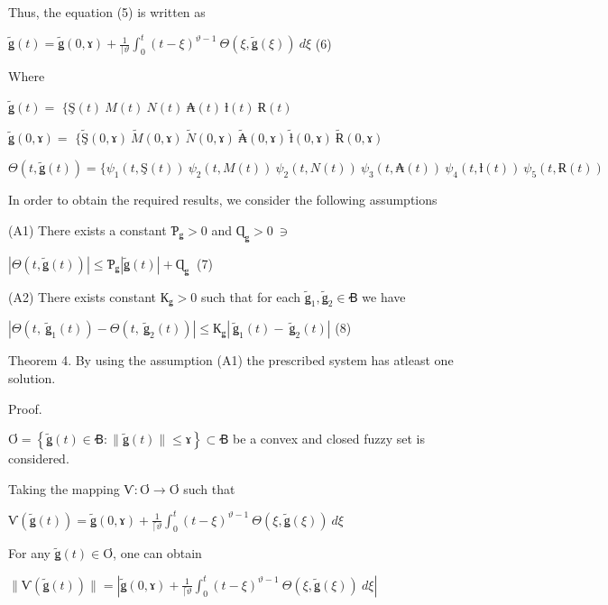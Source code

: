 Thus, the equation (5) is written as

\(\widetilde{ǥ}(t) = \widetilde{ǥ}(0,ɤ) + \frac{1}{\lceil\vartheta}\int_{0}^{t}{}(t - \xi)^{\vartheta - 1}\ \Theta\left( \xi,\widetilde{ǥ}(\xi) \right)\ d\xi\) (6)

Where

\(\widetilde{ǥ}(t) =\) \(\{ Ş(t)\ M(t)\ N(t)\ ₳(t)\ ƚ(t)\ Ɍ(t)\ \)

\(\widetilde{ǥ}(0,ɤ) =\) \(\{\widetilde{Ş}(0,ɤ)\ \widetilde{M}(0,ɤ)\ \widetilde{N}(0,ɤ)\ \widetilde{₳}(0,ɤ)\ \widetilde{ƚ}(0,ɤ)\ \widetilde{Ɍ}(0,ɤ)\ \)

\(\Theta\left( t,\widetilde{ǥ}(t) \right) = \{\psi_{1}\left( t,Ş(t) \right)\ \psi_{2}\left( t,M(t) \right)\ \psi_{2}\left( t,N(t) \right)\ \psi_{3}\left( t,₳(t) \right)\ \psi_{4}\left( t,ƚ(t) \right)\ \psi_{5}\left( t,Ɍ(t) \right)\ \)

In order to obtain the required results, we consider the following assumptions

(A1) There exists a constant \(Ƥ_{ǥ} > 0\) and \(Ɋ_{ǥ} > 0\  \ni \ \)

\(\left| \Theta\left( t,\widetilde{ǥ}(t) \right) \right| \leq Ƥ_{ǥ}\left| \widetilde{ǥ}(t) \right| + Ɋ_{ǥ}\ \) (7)

(A2) There exists constant \(К_{ǥ} > 0\) such that for each \({\widetilde{ǥ}}_{1},{\widetilde{ǥ}}_{2} \in Ꞗ\) we have

\(\left| \Theta\left( t,\ {\widetilde{ǥ}}_{1}(t) \right) - \Theta\left( t,\ {\widetilde{ǥ}}_{2}(t) \right) \right| \leq К_{ǥ}\left| \ {\widetilde{ǥ}}_{1}(t) - \ {\widetilde{ǥ}}_{2}(t) \right|\) (8)

Theorem 4. By using the assumption (A1) the prescribed system has atleast one solution.

Proof.

\(Ơ = \left\{ \widetilde{ǥ}(t) \in Ꞗ:\|\widetilde{ǥ}(t)\| \leq ɤ \right\} \subset Ꞗ\) be a convex and closed fuzzy set is considered.

Taking the mapping \(Ѵ:Ơ \rightarrow Ơ\) such that

\(Ѵ\left( \widetilde{ǥ}(t) \right) = \widetilde{ǥ}(0,ɤ) + \frac{1}{\lceil\vartheta}\int_{0}^{t}{}(t - \xi)^{\vartheta - 1}\ \Theta\left( \xi,\widetilde{ǥ}(\xi) \right)\ d\xi\)

For any \(\widetilde{ǥ}(t) \in Ơ\), one can obtain

\(\| Ѵ\left( \widetilde{ǥ}(t) \right)\| = \left| \widetilde{ǥ}(0,ɤ) + \frac{1}{\lceil\vartheta}\int_{0}^{t}{}(t - \xi)^{\vartheta - 1}\ \Theta\left( \xi,\widetilde{ǥ}(\xi) \right)\ d\xi \right|\ \)

